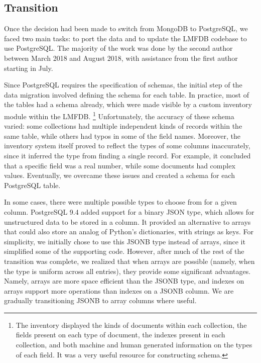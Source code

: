 \documentclass{amsart}
\begin{document}
\subsection{Transition}

Once the decision had been made to switch from MongoDB to PostgreSQL, we faced two main tasks: to port the data and to update the LMFDB codebase to use PostgreSQL.
The majority of the work was done by the second author between March 2018 and August 2018, with assistance from the first author starting in July.

Since PostgreSQL requires the specification of schemas, the initial step of the data migration involved defining the schema for each table.
In practice, most of the tables had a schema already, which were made visible by a custom inventory module within the LMFDB.%
\footnote{The inventory displayed the kinds of documents within each collection, the fields present on each type of document, the indexes present in each collection, and both machine and human generated information on the types of each field.
It was a very useful resource for constructing schema.}
Unfortunately, the accuracy of these schema varied: some collections had multiple independent kinds of records within the same table, while others had typos in some of the field names.
Moreover, the inventory system itself proved to reflect the types of some columns inaccurately, since it inferred the type from finding a single record.
For example, it concluded that a specific field was a real number, while some documents had complex values.
Eventually, we overcame these issues and created a schema for each PostgreSQL table.

In some cases, there were multiple possible types to choose from for a given column.
PostgreSQL 9.4 added support for a binary JSON type, which allows for unstructured data to be stored in a column.
It provided an alternative to arrays that could also store an analog of Python's dictionaries, with strings as keys.
For simplicity, we initially chose to use this JSONB type instead of arrays, since it simplified some of the supporting code.
However, after much of the rest of the transition was complete, we realized that when arrays are possible (namely, when the type is uniform across all entries), they provide some significant advantages.
Namely, arrays are more space efficient than the JSONB type, and indexes on arrays support more operations than indexes on a JSONB column.
We are gradually transitioning JSONB to array columns where useful.
\end{document}
